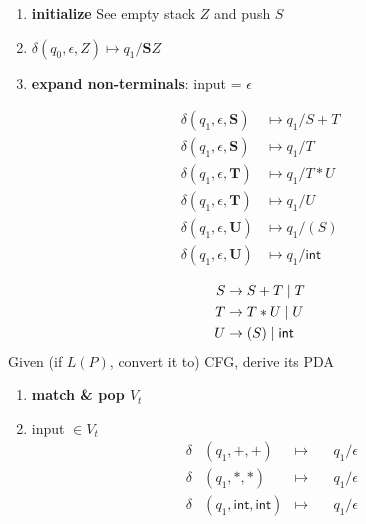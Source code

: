 {\footnotesize
\begin{minipage}{\linewidth}
\begin{enumerate}
\item \textbf{initialize} See empty stack \(Z\) and push \(S\)
\item[] \(\delta(q_{0},\epsilon,Z) \mapsto q_{1}/\mathbf{S}Z\)
\item \textbf{expand non-terminals}: input = \(\epsilon\)
\end{enumerate}
\end{minipage}
\begin{minipage}[t]{0.45\linewidth}
  \setlength{\abovedisplayskip}{1pt}
  \setlength{\belowdisplayskip}{1pt}
  \begin{align*}
   \delta(q_{1},\epsilon,\mathbf{S})& \mapsto q_{1}/S+T\\
   \delta(q_{1},\epsilon,\mathbf{S})& \mapsto q_{1}/T\\
   \delta(q_{1},\epsilon,\mathbf{T})& \mapsto q_{1}/T * U\\
   \delta(q_{1},\epsilon,\mathbf{T})& \mapsto q_{1}/U\\
   \delta(q_{1},\epsilon,\mathbf{U})& \mapsto q_{1}/(S)\\
   \delta(q_{1},\epsilon,\mathbf{U})& \mapsto q_{1}/\mathsf{int}
  \end{align*}
\end{minipage}
\begin{minipage}[t]{0.4\linewidth}
\begin{align*}
  S &\rightarrow S + T \;|\; T\\
  T &\rightarrow T * U \;|\; U\\
  U &\rightarrow (S) \;|\; \mathsf{int}
\end{align*}
Given (if \(L(P)\), convert it to) CFG, derive its PDA
\end{minipage}
\begin{minipage}[t]{0.4\linewidth}
\begin{enumerate}[resume,start=3]
\item \textbf{match \& pop \(V_{t}\)}
\item[] input \(\in V_{t}\)
  \begin{align*}
  \delta&(q_{1},\mathbf{+},\mathbf{+})& \mapsto &\quad q_{1}/\epsilon\\
  \delta&(q_{1},\mathbf{*},\mathbf{*})& \mapsto &\quad q_{1}/\epsilon\\
  \delta&(q_{1},\mathsf{int},\mathsf{int})& \mapsto &\quad q_{1}/\epsilon\\

\end{align*}
\end{enumerate}
\end{minipage}}
